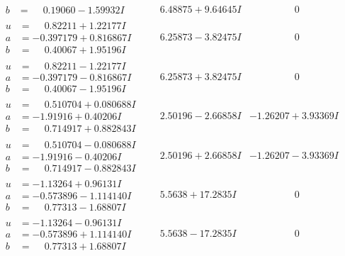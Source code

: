 \documentclass[1p]{elsarticle_modified}
\theoremstyle{definition}
\begin{document}
$$\begin{array}{c|c|c}
\begin{aligned}
b &= \phantom{-}0.19060 - 1.59932 I\end{aligned}
 & \phantom{-}6.48875 + 9.64645 I & \phantom{-0.000000 } 0 \\ \hline\begin{aligned}
u &= \phantom{-}0.82211 + 1.22177 I \\
a &= -0.397179 + 0.816867 I \\
b &= \phantom{-}0.40067 + 1.95196 I\end{aligned}
 & \phantom{-}6.25873 - 3.82475 I & \phantom{-0.000000 } 0 \\ \hline\begin{aligned}
u &= \phantom{-}0.82211 - 1.22177 I \\
a &= -0.397179 - 0.816867 I \\
b &= \phantom{-}0.40067 - 1.95196 I\end{aligned}
 & \phantom{-}6.25873 + 3.82475 I & \phantom{-0.000000 } 0 \\ \hline\begin{aligned}
u &= \phantom{-}0.510704 + 0.080688 I \\
a &= -1.91916 + 0.40206 I \\
b &= \phantom{-}0.714917 + 0.882843 I\end{aligned}
 & \phantom{-}2.50196 - 2.66858 I & -1.26207 + 3.93369 I \\ \hline\begin{aligned}
u &= \phantom{-}0.510704 - 0.080688 I \\
a &= -1.91916 - 0.40206 I \\
b &= \phantom{-}0.714917 - 0.882843 I\end{aligned}
 & \phantom{-}2.50196 + 2.66858 I & -1.26207 - 3.93369 I \\ \hline\begin{aligned}
u &= -1.13264 + 0.96131 I \\
a &= -0.573896 - 1.114140 I \\
b &= \phantom{-}0.77313 - 1.68807 I\end{aligned}
 & \phantom{-}5.5638 + 17.2835 I & \phantom{-0.000000 } 0 \\ \hline\begin{aligned}
u &= -1.13264 - 0.96131 I \\
a &= -0.573896 + 1.114140 I \\
b &= \phantom{-}0.77313 + 1.68807 I\end{aligned}
 & \phantom{-}5.5638 - 17.2835 I & \phantom{-0.000000 } 0 \\ \hline\begin{aligned}

\end{aligned}
\end{array}$$
\end{document}
